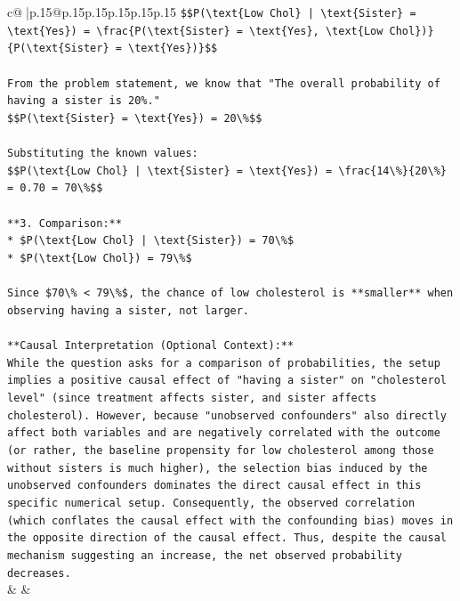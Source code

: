 \documentclass{article}
\begin{document}
{\begin{supertabular}{c@{$\;$}|p{.15\linewidth}@{}p{.15\linewidth}p{.15\linewidth}p{.15\linewidth}p{.15\linewidth}p{.15\linewidth}}
{{{\texttt{\$\$P(\textbackslash{}text\{Low Chol\} | \textbackslash{}text\{Sister\} = \textbackslash{}text\{Yes\}) = \textbackslash{}frac\{P(\textbackslash{}text\{Sister\} = \textbackslash{}text\{Yes\}, \textbackslash{}text\{Low Chol\})\}\{P(\textbackslash{}text\{Sister\} = \textbackslash{}text\{Yes\})\}\$\$} \\
\\ 
\texttt{From the problem statement, we know that "The overall probability of having a sister is 20\%."} \\
\texttt{\$\$P(\textbackslash{}text\{Sister\} = \textbackslash{}text\{Yes\}) = 20\textbackslash{}\%\$\$} \\
\\ 
\texttt{Substituting the known values:} \\
\texttt{\$\$P(\textbackslash{}text\{Low Chol\} | \textbackslash{}text\{Sister\} = \textbackslash{}text\{Yes\}) = \textbackslash{}frac\{14\textbackslash{}\%\}\{20\textbackslash{}\%\} = 0.70 = 70\textbackslash{}\%\$\$} \\
\\ 
\texttt{**3. Comparison:**} \\
\texttt{*   \$P(\textbackslash{}text\{Low Chol\} | \textbackslash{}text\{Sister\}) = 70\textbackslash{}\%\$} \\
\texttt{*   \$P(\textbackslash{}text\{Low Chol\}) = 79\textbackslash{}\%\$} \\
\\ 
\texttt{Since \$70\textbackslash{}\% < 79\textbackslash{}\%\$, the chance of low cholesterol is **smaller** when observing having a sister, not larger.} \\
\\ 
\texttt{**Causal Interpretation (Optional Context):**} \\
\texttt{While the question asks for a comparison of probabilities, the setup implies a positive causal effect of "having a sister" on "cholesterol level" (since treatment affects sister, and sister affects cholesterol). However, because "unobserved confounders" also directly affect both variables and are negatively correlated with the outcome (or rather, the baseline propensity for low cholesterol among those without sisters is much higher), the selection bias induced by the unobserved confounders dominates the direct causal effect in this specific numerical setup. Consequently, the observed correlation (which conflates the causal effect with the confounding bias) moves in the opposite direction of the causal effect. Thus, despite the causal mechanism suggesting an increase, the net observed probability decreases.} \\
            }
        }
    }
    & & \\ \\


\end{supertabular}}
\end{document}
